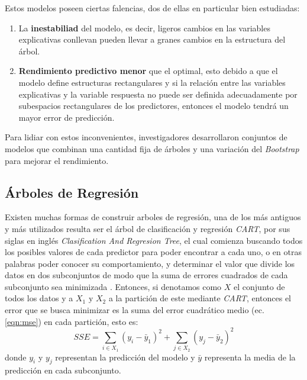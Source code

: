 Estos modelos poseen ciertas falencias, dos de ellas en particular bien estudiadas:
\begin{enumerate}
    \item La \textbf{inestabiliad} del modelo, es decir, ligeros cambios en las variables explicativas conllevan
          pueden llevar a granes cambios en la estructura del árbol.
    \item \textbf{Rendimiento predictivo menor} que el optimal, esto debido a que el modelo define estructuras rectangulares y si 
          la relación entre las variables explicativas y la variable respuesta no puede ser definida adecuadamente por
          subespacios rectangulares de los predictores, entonces el modelo tendrá un mayor error de predicción.
\end{enumerate} 


Para lidiar con estos inconvenientes, investigadores desarrollaron conjuntos de modelos que combinan una cantidad fija de árboles
y una variación del \textit{Bootstrap} para mejorar el rendimiento.

    \subsection{Árboles de Regresión}
    Existen muchas formas de construir arboles de regresión, una de los más antiguos y más utilizados
    resulta ser el árbol de clasificación y regresión \textit{CART}, por sus siglas en inglés 
    \textit{Clasification And Regresion Tree}, el cual comienza buscando todos los posibles valores de cada predictor para poder encontrar a cada uno,
    o en otras palabras poder conocer su comportamiento, y determinar el valor que divide los datos en dos subconjuntos de modo que la suma de errores 
    cuadrados de cada subconjunto sea minimizada \cite{18}. Entonces, si denotamos como $X$ el conjunto de todos los datos y a $X_1 \text{ y } X_2$ a la
    partición de este mediante \textit{CART}, entonces el error que se busca minimizar es la suma del error cuadrático medio (ec. \ref{eqn:mse}) en cada partición, esto es:
    \begin{equation*} 
        SSE = \sum_{i\in X_1}(y_i-\bar{y}_1)^2+ \sum_{j\in X_2}(y_j-\bar{y}_2)^2
    \end{equation*}
    donde $y_i$ y $y_j$ representan la predicción del modelo y $\bar{y}$ representa la media de la predicción en cada subconjunto.

